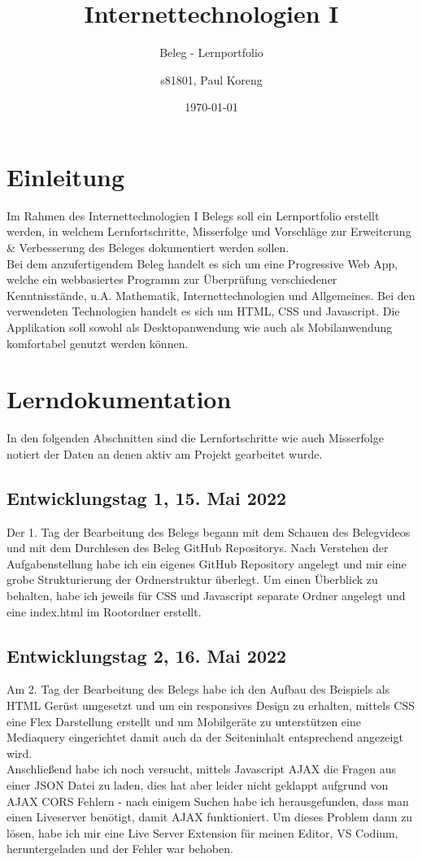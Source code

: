 \documentclass[a4paper,12pt,titlepage]{scrartcl}
\title{Internettechnologien I}
\subtitle{Beleg - Lernportfolio}
\author{s81801, Paul Koreng}
\date{\today}
\begin{document}
    {
        \centering
        \maketitle
    }
    \newpage
    \tableofcontents
    \newpage
    \section{Einleitung}
        Im Rahmen des Internettechnologien I Belegs soll ein Lernportfolio erstellt werden, in welchem Lernfortschritte, Misserfolge und Vorschläge zur Erweiterung \& Verbesserung des Beleges dokumentiert werden sollen.\\
        Bei dem anzufertigendem Beleg handelt es sich um eine Progressive Web App, welche ein webbasiertes Programm zur Überprüfung verschiedener Kenntnisstände, u.A. Mathematik, Internettechnologien und Allgemeines. Bei den verwendeten Technologien handelt es sich um HTML, CSS und Javascript. Die Applikation soll sowohl als Desktopanwendung wie auch als Mobilanwendung komfortabel genutzt werden können.
    \newpage
    \section{Lerndokumentation}
        In den folgenden Abschnitten sind die Lernfortschritte wie auch Misserfolge notiert der Daten an denen aktiv am Projekt gearbeitet wurde.
        \subsection{Entwicklungstag 1, 15. Mai 2022}
            Der 1. Tag der Bearbeitung des Belegs begann mit dem Schauen des Belegvideos und mit dem Durchlesen des Beleg GitHub Repositorys. Nach Verstehen der Aufgabenstellung habe ich ein eigenes GitHub Repository angelegt und mir eine grobe Strukturierung der Ordnerstruktur überlegt. Um einen Überblick zu behalten, habe ich jeweils für CSS und Javascript separate Ordner angelegt und eine index.html im Rootordner erstellt.
        \subsection{Entwicklungstag 2, 16. Mai 2022}
            Am 2. Tag der Bearbeitung des Belegs habe ich den Aufbau des Beispiels als HTML Gerüst umgesetzt und um ein responsives Design zu erhalten, mittels CSS eine Flex Darstellung erstellt und um Mobilgeräte zu unterstützen eine Mediaquery eingerichtet damit auch da der Seiteninhalt entsprechend angezeigt wird.\\
            Anschließend habe ich noch versucht, mittels Javascript AJAX die Fragen aus einer JSON Datei zu laden, dies hat aber leider nicht geklappt aufgrund von AJAX CORS Fehlern - nach einigem Suchen habe ich herausgefunden, dass man einen Liveserver benötigt, damit AJAX funktioniert. Um dieses Problem dann zu lösen, habe ich mir eine Live Server Extension für meinen Editor, VS Codium, heruntergeladen und der Fehler war behoben.
\end{document}

